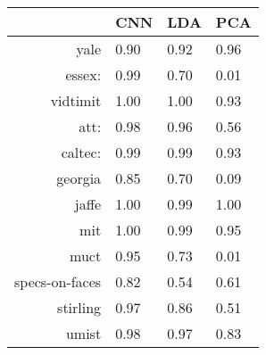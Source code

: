 \begin{tabular}{|r|l|l|l|}
  \hline
    & CNN & LDA & PCA \\
  \hline
  yale & 0.90 & 0.92 & 0.96 \\
  \hline
  essex: & 0.99 & 0.70 & 0.01 \\
  \hline
  vidtimit & 1.00 & 1.00 & 0.93 \\
  \hline
  att: & 0.98 & 0.96 & 0.56 \\
  \hline
  caltec: & 0.99 & 0.99 & 0.93 \\
  \hline
  georgia & 0.85 & 0.70 & 0.09 \\
  \hline
  jaffe & 1.00 & 0.99 & 1.00 \\
  \hline
  mit & 1.00 & 0.99 & 0.95 \\
  \hline
  muct & 0.95 & 0.73 & 0.01 \\
  \hline
  specs-on-faces & 0.82 & 0.54 & 0.61 \\
  \hline
  stirling & 0.97 & 0.86 & 0.51 \\
  \hline
  umist & 0.98 & 0.97 & 0.83 \\
  \hline
\end{tabular}
